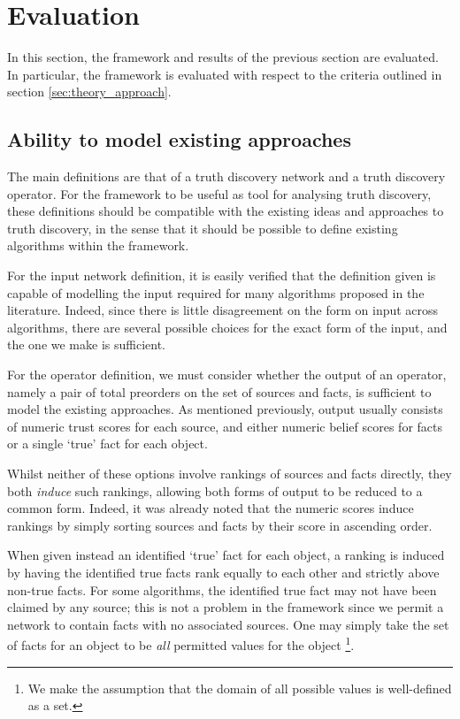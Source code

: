 \documentclass[../main.tex]{subfiles}
\begin{document}
\section{Evaluation}

In this section, the framework and results of the previous section are
evaluated. In particular, the framework is evaluated with respect to the
criteria outlined in section \ref{sec:theory_approach}.

\subsection*{Ability to model existing approaches}

The main definitions are that of a truth discovery network and a truth
discovery operator. For the framework to be useful as tool for analysing truth
discovery, these definitions should be compatible with the existing ideas and
approaches to truth discovery, in the sense that it should be possible to
define existing algorithms within the framework.

For the input network definition, it is easily verified that the definition
given is capable of modelling the input required for many algorithms proposed
in the literature. Indeed, since there is little disagreement on the form on
input across algorithms, there are several possible choices for the exact form
of the input, and the one we make is sufficient.

For the operator definition, we must consider whether the output of an
operator, namely a pair of total preorders on the set of sources and facts, is
sufficient to model the existing approaches. As mentioned previously, output
usually consists of numeric trust scores for each source, and either numeric
belief scores for facts or a single `true' fact for each object.

Whilst neither of these options involve rankings of sources and facts directly,
they both \emph{induce} such rankings, allowing both forms of output to be
reduced to a common form. Indeed, it was already noted that the numeric
scores induce rankings by simply sorting sources and facts by their score in
ascending order.

When given instead an identified `true' fact for each object, a ranking is
induced by having the identified true facts rank equally to each other and
strictly above non-true facts. For some algorithms, the identified true fact
may not have been claimed by any source; this is not a problem in
the framework since we permit a network to contain facts with no associated
sources. One may simply take the set of facts for an object to be \emph{all}
permitted values for the object \footnote{We make the assumption that the
domain of all possible values is well-defined as a set.}.
\end{document}

